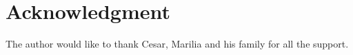 \documentclass[10pt, conference, compsocconf]{IEEEtran}
\begin{document}
\section*{Acknowledgment}

The author would like to thank Cesar, Marilia and his family for all the support.




%
%
%
\end{document}
